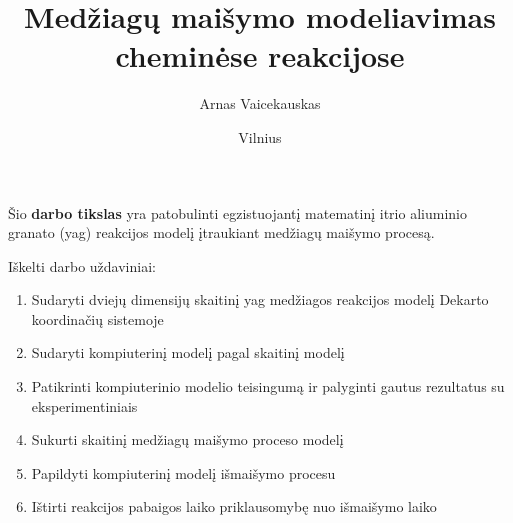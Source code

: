 \documentclass{VUMIFInfKursinis}
\institute{Informatikos institutas}  %
\title{Medžiagų maišymo modeliavimas cheminėse
reakcijose}
\author{Arnas Vaicekauskas}
\date{Vilnius \\ \the\year}
\begin{document}
\maketitle

\tableofcontents




%
%
%

Šio \textbf{darbo tikslas} yra patobulinti egzistuojantį matematinį itrio aliuminio granato (\acs{yag}) reakcijos modelį 
\cite{mackeviciusCloserLookComputer2012} įtraukiant medžiagų maišymo procesą.

Iškelti darbo uždaviniai:

\begin{enumerate}
\item Sudaryti dviejų dimensijų skaitinį \ac{yag} medžiagos reakcijos modelį Dekarto koordinačių sistemoje
\item Sudaryti kompiuterinį modelį pagal skaitinį modelį
\item Patikrinti kompiuterinio modelio teisingumą ir palyginti gautus rezultatus su eksperimentiniais
\item Sukurti skaitinį medžiagų maišymo proceso modelį 
\item Papildyti kompiuterinį modelį išmaišymo procesu
\item Ištirti reakcijos pabaigos laiko priklausomybę nuo išmaišymo laiko
\end{enumerate}


%
\end{document}

